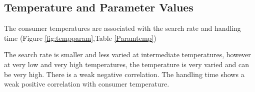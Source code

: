 \documentclass{article}
\begin{document}
\subsection{Temperature and Parameter Values}
The consumer temperatures are associated with the search rate and handling time (Figure \ref{fig:tempparam},Table \ref{Paramtemp}) %

The search rate is smaller and less varied at intermediate temperatures, however at very low and very high temperatures, the temperature is very varied and can be very high. There is a weak negative correlation. The handling time shows a weak positive correlation with consumer temperature.
\begin{figure}[h!t]
\centering
{}\\
 \\

\end{figure}
\end{document}
